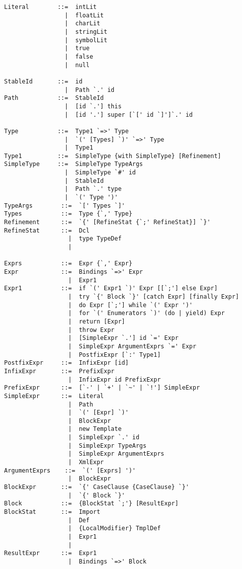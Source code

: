 \begin{lstlisting}
  Literal        ::=  intLit
                   |  floatLit
                   |  charLit
                   |  stringLit
                   |  symbolLit
                   |  true
                   |  false
                   |  null

  StableId       ::=  id
                   |  Path `.' id
  Path           ::=  StableId
                   |  [id `.'] this
                   |  [id '.'] super [`[' id `]']`.' id

  Type           ::=  Type1 `=>' Type
                   |  `(' [Types] `)' `=>' Type
                   |  Type1
  Type1          ::=  SimpleType {with SimpleType} [Refinement]
  SimpleType     ::=  SimpleType TypeArgs
                   |  SimpleType `#' id
                   |  StableId
                   |  Path `.' type
                   |  `(' Type ')'
  TypeArgs        ::=  `[' Types `]'
  Types           ::=  Type {`,' Type}
  Refinement      ::=  `{' [RefineStat {`;' RefineStat}] `}'
  RefineStat      ::=  Dcl
                    |  type TypeDef
                    |

  Exprs           ::=  Expr {`,' Expr}
  Expr            ::=  Bindings `=>' Expr
                    |  Expr1
  Expr1           ::=  if `(' Expr1 `)' Expr [[`;'] else Expr]
                    |  try `{' Block `}' [catch Expr] [finally Expr]
                    |  do Expr [`;'] while `(' Expr ')'
                    |  for `(' Enumerators `)' (do | yield) Expr
                    |  return [Expr]
                    |  throw Expr
                    |  [SimpleExpr `.'] id `=' Expr
                    |  SimpleExpr ArgumentExprs `=' Expr
                    |  PostfixExpr [`:' Type1]
  PostfixExpr     ::=  InfixExpr [id]
  InfixExpr       ::=  PrefixExpr
                    |  InfixExpr id PrefixExpr
  PrefixExpr      ::=  [`-' | `+' | `~' | `!'] SimpleExpr 
  SimpleExpr      ::=  Literal
                    |  Path
                    |  `(' [Expr] `)'
                    |  BlockExpr
                    |  new Template 
                    |  SimpleExpr `.' id 
                    |  SimpleExpr TypeArgs
                    |  SimpleExpr ArgumentExprs
                    |  XmlExpr
  ArgumentExprs    ::=  `(' [Exprs] ')'
                    |  BlockExpr
  BlockExpr       ::=  `{' CaseClause {CaseClause} `}'
                    |  `{' Block `}'
  Block           ::=  {BlockStat `;'} [ResultExpr]
  BlockStat       ::=  Import
                    |  Def
                    |  {LocalModifier} TmplDef
                    |  Expr1
                    |
  ResultExpr      ::=  Expr1
                    |  Bindings `=>' Block


\end{lstlisting}
